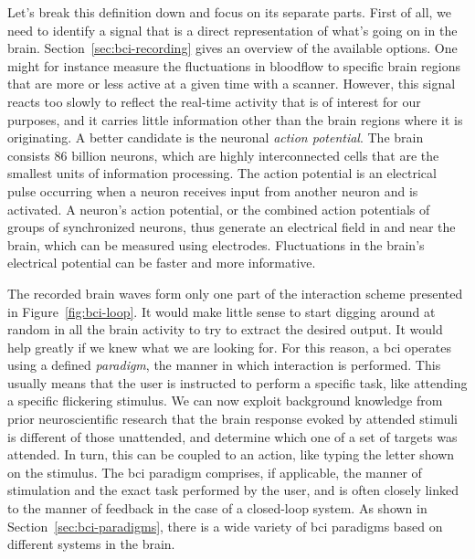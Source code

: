 Let's break this definition down and focus on its separate parts.
First of all, we need to identify a signal that is a direct representation of
what's going on in the brain.
Section~\ref{sec:bci-recording} gives an overview of the available options.
One might for instance measure the fluctuations in bloodflow to specific brain
regions that are more or less active at a given time with a scanner.
However, this signal reacts too slowly to reflect the real-time activity that is
of interest for our purposes, and it carries little information other than the
brain regions where it is originating.
A better candidate is the neuronal \emph{action potential}.
The brain consists 86 billion neurons, which are highly interconnected cells that are
the smallest units of information processing.
The action potential is an electrical pulse occurring when a neuron receives
input from another neuron and is activated.
A neuron's action potential, or the combined action potentials of groups of
synchronized neurons, thus generate an electrical field in and near the brain,
which can be measured using electrodes.
Fluctuations in the brain's electrical potential can be faster and more
informative.

The recorded brain waves form only one part of the interaction scheme presented
in Figure~\ref{fig:bci-loop}.
It would make little sense to start digging around at random in all the brain
activity to try to extract the desired output.
It would help greatly if we knew what we are looking for.
For this reason, a \ac{bci} operates using a defined \emph{paradigm}, the manner in
which interaction is performed.
This usually means that the user is instructed to perform a specific task, like
attending a specific flickering stimulus.
We can now exploit background knowledge from prior neuroscientific research
that the brain response evoked by attended stimuli is different of those
unattended,
and determine which one of a set of targets was attended.
In turn, this can be coupled to an action, like typing the letter shown on the
stimulus.
The \ac{bci} paradigm comprises, if applicable, the manner of stimulation and the
exact task performed by the user, and is often closely linked to the manner of
feedback in the case of a closed-loop system.
As shown in Section~\ref{sec:bci-paradigms}, there is a wide variety of \ac{bci}
paradigms based on different systems in the brain.

